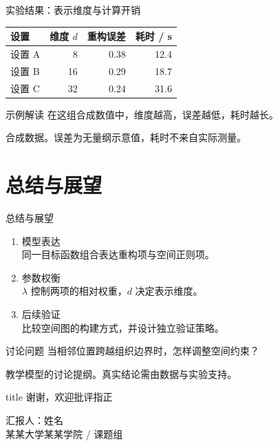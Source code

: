 \documentclass[aspectratio=169,11pt]{beamer}
\newcommand{\smallnote}[1]{\par{\scriptsize\color{NoteGray}#1\par}}
\newcommand{\spaceditem}{\setlength{\itemsep}{.65em}}
\begin{document}
\begin{frame}{实验结果：表示维度与计算开销}
  \begin{center}
    \renewcommand{\arraystretch}{1.55}
    \setlength{\tabcolsep}{8mm}
    \begin{tabular}{@{}lrrr@{}}
      \toprule
      设置 & 维度 $d$ & 重构误差 & 耗时 / s\\
      \midrule
      设置 A & 8  & 0.38 & 12.4\\
      设置 B & 16 & 0.29 & 18.7\\
      设置 C & 32 & 0.24 & 31.6\\
      \bottomrule
    \end{tabular}
  \end{center}
  \vspace{4mm}
  \begin{block}{示例解读}
    在这组合成数值中，维度越高，误差越低，耗时越长。
  \end{block}
  \vspace{3mm}
  \smallnote{合成数据。误差为无量纲示意值，耗时不来自实际测量。}
\end{frame}

\section{总结与展望}
\begin{frame}{总结与展望}
  \begin{enumerate}\spaceditem
    \item {\color{AcademicBlue}模型表达}\\[1mm]
      同一目标函数组合表达重构项与空间正则项。
    \item {\color{AcademicBlue}参数权衡}\\[1mm]
      $\lambda$ 控制两项的相对权重，$d$ 决定表示维度。
    \item {\color{AcademicBlue}后续验证}\\[1mm]
      比较空间图的构建方式，并设计独立验证策略。
  \end{enumerate}
  \vspace{4mm}
  \begin{block}{讨论问题}
    当相邻位置跨越组织边界时，怎样调整空间约束？
  \end{block}
  \vfill
  \smallnote{教学模型的讨论提纲。真实结论需由数据与实验支持。}
\end{frame}

\begin{frame}
  \vfill
  \begin{beamercolorbox}[sep=8mm,center,rounded=true,shadow=true]{title}
    {\Large 谢谢，欢迎批评指正}
  \end{beamercolorbox}
  \vspace{8mm}
  \begin{center}
    汇报人：姓名\\[3mm]
    {\small 某某大学\quad 某某学院 / 课题组}
  \end{center}
  \vfill
\end{frame}
\end{document}
